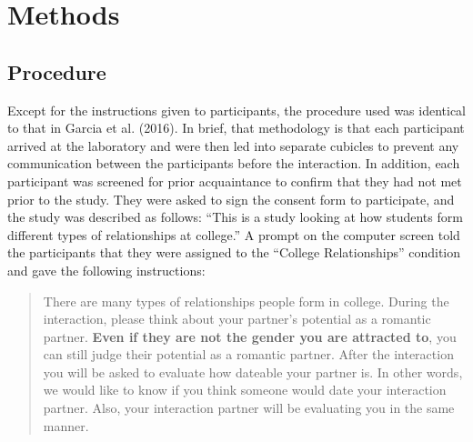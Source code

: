 \documentclass[man]{apa6}
\begin{document}
\section{Methods}\label{methods}

\subsection{Procedure}\label{procedure}

Except for the instructions given to participants, the procedure used
was identical to that in Garcia et al. (2016). In brief, that
methodology is that each participant arrived at the laboratory and were
then led into separate cubicles to prevent any communication between the
participants before the interaction. In addition, each participant was
screened for prior acquaintance to confirm that they had not met prior
to the study. They were asked to sign the consent form to participate,
and the study was described as follows: \enquote{This is a study looking
at how students form different types of relationships at college.} A
prompt on the computer screen told the participants that they were
assigned to the \enquote{College Relationships} condition and gave the
following instructions:

\begin{quote}
There are many types of relationships people form in college. During the
interaction, please think about your partner's potential as a romantic
partner. \textbf{Even if they are not the gender you are attracted to},
you can still judge their potential as a romantic partner. After the
interaction you will be asked to evaluate how dateable your partner is.
In other words, we would like to know if you think someone would date
your interaction partner. Also, your interaction partner will be
evaluating you in the same manner.
\end{quote}
\end{document}
